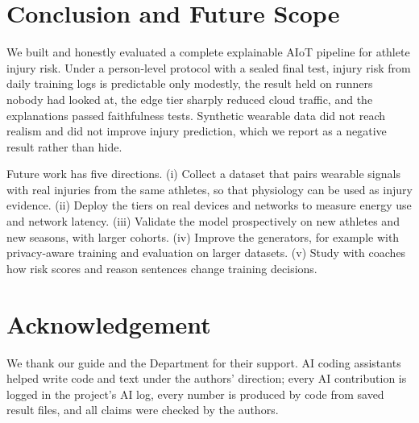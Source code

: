 \documentclass[12pt,a4paper]{article}
\begin{document}
\section{Conclusion and Future Scope}\label{sec:conclusion}
We built and honestly evaluated a complete explainable AIoT pipeline for athlete injury risk.
Under a person-level protocol with a sealed final test, injury risk from daily training logs is
predictable only modestly, the result held on runners nobody had looked at, the edge tier sharply
reduced cloud traffic, and the explanations passed faithfulness tests. Synthetic wearable data
did not reach realism and did not improve injury prediction, which we report as a negative
result rather than hide.

Future work has five directions. (i) Collect a dataset that pairs wearable signals with real
injuries from the same athletes, so that physiology can be used as injury evidence. (ii) Deploy
the tiers on real devices and networks to measure energy use and network latency. (iii) Validate
the model prospectively on new athletes and new seasons, with larger cohorts. (iv) Improve the
generators, for example with privacy-aware training and evaluation on larger datasets. (v) Study
with coaches how risk scores and reason sentences change training decisions.

\section*{Acknowledgement}
We thank our guide and the Department for their support. AI coding assistants helped write code
and text under the authors' direction; every AI contribution is logged in the project's AI log,
every number is produced by code from saved result files, and all claims were checked by the
authors.



\end{document}
